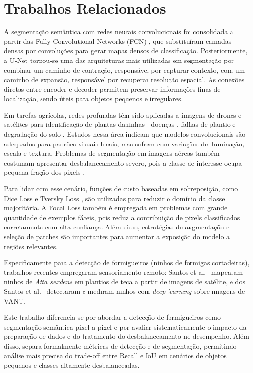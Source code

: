\documentclass[10pt,a4paper,twocolumn]{article}
\begin{document}
\section{Trabalhos Relacionados}

A segmentação semântica com redes neurais convolucionais foi consolidada a partir das Fully Convolutional Networks (FCN) \cite{long2015}, que substituíram camadas densas por convoluções para gerar mapas densos de classificação. Posteriormente, a U-Net \cite{ronneberger2015} tornou-se uma das arquiteturas mais utilizadas em segmentação por combinar um caminho de contração, responsável por capturar contexto, com um caminho de expansão, responsável por recuperar resolução espacial. As conexões diretas entre encoder e decoder permitem preservar informações finas de localização, sendo úteis para objetos pequenos e irregulares.

Em tarefas agrícolas, redes profundas têm sido aplicadas a imagens de drones e satélites para identificação de plantas daninhas \cite{milioto2018,sa2018}, doenças \cite{mohanty2016}, falhas de plantio e degradação do solo \cite{kamilaris2018}. Estudos nessa área indicam que modelos convolucionais são adequados para padrões visuais locais, mas sofrem com variações de iluminação, escala e textura. Problemas de segmentação em imagens aéreas também costumam apresentar desbalanceamento severo, pois a classe de interesse ocupa pequena fração dos pixels \cite{sa2018}.

Para lidar com esse cenário, funções de custo baseadas em sobreposição, como Dice Loss \cite{milletari2016} e Tversky Loss \cite{salehi2017}, são utilizadas para reduzir o domínio da classe majoritária. A Focal Loss \cite{lin2017} também é empregada em problemas com grande quantidade de exemplos fáceis, pois reduz a contribuição de pixels classificados corretamente com alta confiança. Além disso, estratégias de augmentação \cite{buslaev2020} e seleção de patches \cite{ronneberger2015} são importantes para aumentar a exposição do modelo a regiões relevantes.

Especificamente para a detecção de formigueiros (ninhos de formigas cortadeiras), trabalhos recentes empregaram sensoriamento remoto: Santos et al.~\cite{santos2019} mapearam ninhos de \textit{Atta sexdens} em plantios de teca a partir de imagens de satélite, e dos Santos et al.~\cite{dossantos2022} detectaram e mediram ninhos com \textit{deep learning} sobre imagens de VANT.

Este trabalho diferencia-se por abordar a detecção de formigueiros como segmentação semântica pixel a pixel e por avaliar sistematicamente o impacto da preparação de dados e do tratamento do desbalanceamento no desempenho. Além disso, separa formalmente métricas de detecção e de segmentação, permitindo análise mais precisa do trade-off entre Recall e IoU em cenários de objetos pequenos e classes altamente desbalanceadas.
\end{document}
